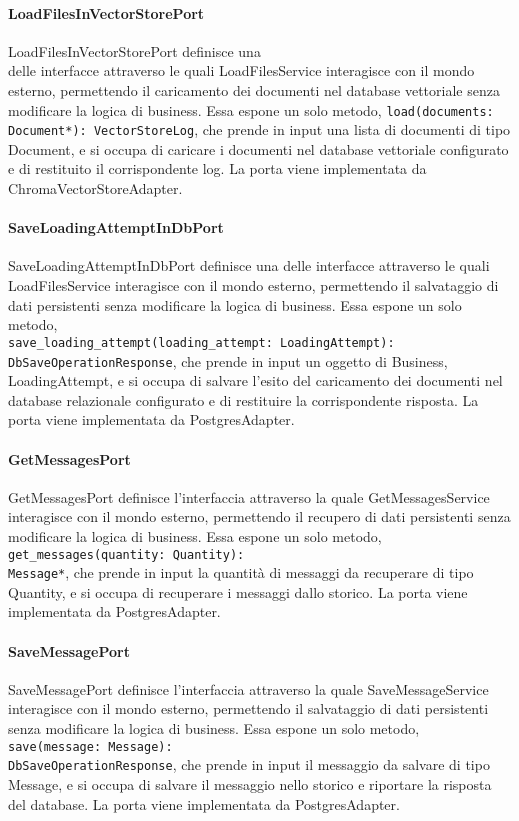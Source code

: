 \paragraph{LoadFilesInVectorStorePort}
\label{sec:load_files_in_vector_store_port}
LoadFilesInVectorStorePort definisce una\\ delle interfacce attraverso le quali LoadFilesService interagisce con il mondo esterno, permettendo il caricamento dei documenti nel database vettoriale senza modificare la logica di business. Essa espone un solo metodo, \texttt{load(documents: Document*): VectorStoreLog}, che prende in input una lista di documenti di tipo Document, e si occupa di caricare i documenti nel database vettoriale configurato e di restituito il corrispondente log. La porta viene implementata da ChromaVectorStoreAdapter.

\paragraph{SaveLoadingAttemptInDbPort}
\label{sec:save_loading_attempt_in_db_port}
SaveLoadingAttemptInDbPort definisce una delle interfacce attraverso le quali LoadFilesService interagisce con il mondo esterno, permettendo il salvataggio di dati persistenti senza modificare la logica di business. Essa espone un solo metodo,\\ \texttt{save\_loading\_attempt(loading\_attempt: LoadingAttempt): DbSaveOperationResponse}, che prende in input un oggetto di Business, LoadingAttempt, e si occupa di salvare l'esito del caricamento dei documenti nel database relazionale configurato e di restituire la corrispondente risposta. La porta viene implementata da PostgresAdapter.

\paragraph{GetMessagesPort}
\label{sec:get_messages_port}
GetMessagesPort definisce l'interfaccia attraverso la quale GetMessagesService interagisce con il mondo esterno, permettendo il recupero di dati persistenti senza modificare la logica di business. Essa espone un solo metodo, \texttt{get\_messages(quantity: Quantity):\\ Message*}, che prende in input la quantità di messaggi da recuperare di tipo Quantity, e si occupa di recuperare i messaggi dallo storico. La porta viene implementata da PostgresAdapter.

\paragraph{SaveMessagePort}
\label{sec:save_message_port}
SaveMessagePort definisce l'interfaccia attraverso la quale SaveMessageService interagisce con il mondo esterno, permettendo il salvataggio di dati persistenti senza modificare la logica di business. Essa espone un solo metodo, \texttt{save(message: Message):\\ DbSaveOperationResponse}, che prende in input il messaggio da salvare di tipo Message, e si occupa di salvare il messaggio nello storico e riportare la risposta del database. La porta viene implementata da PostgresAdapter.

